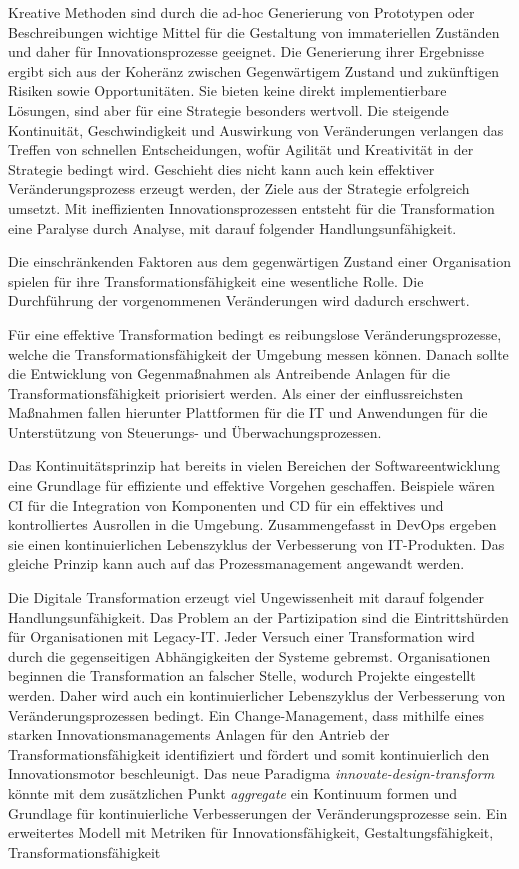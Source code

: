 Kreative Methoden sind durch die ad-hoc Generierung von Prototypen oder Beschreibungen wichtige Mittel für die Gestaltung von immateriellen Zuständen und daher für Innovationsprozesse geeignet. Die Generierung ihrer Ergebnisse ergibt sich aus der Koheränz zwischen Gegenwärtigem Zustand und zukünftigen Risiken sowie Opportunitäten. Sie bieten keine direkt implementierbare Lösungen, sind aber für eine Strategie besonders wertvoll. Die steigende Kontinuität, Geschwindigkeit und Auswirkung von Veränderungen verlangen das Treffen von schnellen Entscheidungen, wofür Agilität und Kreativität in der Strategie bedingt wird. Geschieht dies nicht kann auch kein effektiver Veränderungsprozess erzeugt werden, der Ziele aus der Strategie erfolgreich umsetzt. Mit ineffizienten Innovationsprozessen entsteht für die Transformation eine Paralyse durch Analyse, mit darauf folgender Handlungsunfähigkeit. 

Die einschränkenden Faktoren aus dem gegenwärtigen Zustand einer Organisation spielen für ihre Transformationsfähigkeit eine wesentliche Rolle. Die Durchführung der vorgenommenen Veränderungen wird dadurch erschwert. 

Für eine effektive Transformation bedingt es reibungslose Veränderungsprozesse, welche die Transformationsfähigkeit der Umgebung messen können. Danach sollte die Entwicklung von Gegenmaßnahmen als Antreibende Anlagen für die Transformationsfähigkeit priorisiert werden. Als einer der einflussreichsten Maßnahmen fallen hierunter Plattformen für die IT und Anwendungen für die Unterstützung von Steuerungs- und Überwachungsprozessen.

Das Kontinuitätsprinzip hat bereits in vielen Bereichen der Softwareentwicklung eine Grundlage für effiziente und effektive Vorgehen geschaffen. Beispiele wären \ac{CI} für die Integration von Komponenten und \ac{CD} für ein effektives und kontrolliertes Ausrollen in die Umgebung. Zusammengefasst in DevOps ergeben sie einen kontinuierlichen Lebenszyklus der Verbesserung von IT-Produkten. Das gleiche Prinzip kann auch auf das Prozessmanagement angewandt werden.

Die Digitale Transformation erzeugt viel Ungewissenheit mit darauf folgender Handlungsunfähigkeit. Das Problem an der Partizipation sind die Eintrittshürden für Organisationen mit Legacy-IT. Jeder Versuch einer Transformation wird durch die gegenseitigen Abhängigkeiten der Systeme gebremst. Organisationen beginnen die Transformation an falscher Stelle, wodurch Projekte eingestellt werden. Daher wird auch ein kontinuierlicher Lebenszyklus der Verbesserung von Veränderungsprozessen bedingt. Ein Change-Management, dass mithilfe eines starken Innovationsmanagements Anlagen für den Antrieb der Transformationsfähigkeit identifiziert und fördert und somit kontinuierlich den Innovationsmotor beschleunigt.
Das neue Paradigma \emph{innovate-design-transform} könnte mit dem zusätzlichen Punkt \emph{aggregate} ein Kontinuum formen und Grundlage für kontinuierliche Verbesserungen der Veränderungsprozesse sein. Ein erweitertes Modell mit Metriken für Innovationsfähigkeit, Gestaltungsfähigkeit, Transformationsfähigkeit

